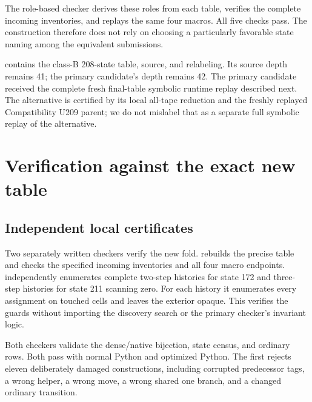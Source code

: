 \documentclass[11pt,letterpaper]{article}
\begin{document}
The role-based checker derives these roles from each table, verifies the
complete incoming inventories, and replays the same four macros. All five
checks pass. The construction therefore does not rely on choosing a
particularly favorable state naming among the equivalent submissions.

 contains the class-B 208-state table,
source, and relabeling. Its source depth remains 41; the primary candidate's
depth remains 42. The primary candidate received the complete fresh final-table
symbolic runtime replay described next. The alternative is certified by its
local all-tape reduction and the freshly replayed Compatibility U209 parent;
we do not mislabel that as a separate full symbolic replay of the alternative.

\section{Verification against the exact new table}\label{sec:verification}
\subsection{Independent local certificates}
Two separately written checkers verify the new fold.
 rebuilds the precise table and checks the
specified incoming inventories and all four macro endpoints.
 independently enumerates complete
two-step histories for state 172 and three-step histories for state 211
scanning zero. For each history it enumerates every assignment on touched
cells and leaves the exterior opaque. This verifies the guards without
importing the discovery search or the primary checker's invariant logic.

Both checkers validate the dense/native bijection, state census, and ordinary
rows. Both pass with normal Python and optimized Python.
The first rejects eleven deliberately damaged constructions, including
corrupted predecessor tags, a wrong helper, a wrong move, a wrong shared
one branch, and a changed ordinary transition.
\end{document}

